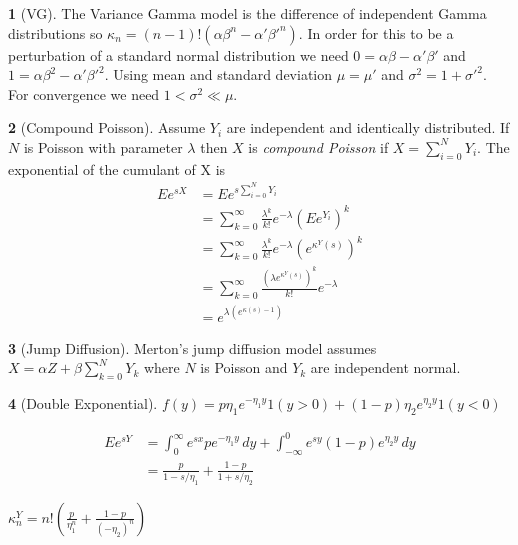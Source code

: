 \documentclass[fleqn]{amsart}
\theoremstyle{definition}
\newtheorem*{example}{}
\begin{document}
\begin{example}[VG]
The Variance Gamma model is the difference of independent Gamma distributions
so \(\kappa_n = (n-1)!(\alpha\beta^n - \alpha'\beta'^n)\).
In order for this to be a perturbation of a standard normal
distribution we need \(0 = \alpha\beta - \alpha'\beta'\)
and \(1 = \alpha\beta^2 - \alpha'\beta'^2\).
Using mean and standard deviation
\(\mu = \mu'\) and \(\sigma^2 = 1 + \sigma'^2\).
For convergence we need \(1 < \sigma^2 \ll \mu\).
\end{example}

\begin{example}[Compound Poisson]
Assume \(Y_i\) are independent and identically distributed. If \(N\) is
Poisson with parameter \(\lambda\) then \(X\) is {\em compound Poisson}
if \(X = \sum_{i=0}^N Y_i\).
The exponential of the cumulant of X is
\begin{align*}
Ee^{sX} &= Ee^{s\sum_{i=0}^N Y_i}\\
&= \sum_{k=0}^\infty \frac{\lambda^k}{k!}e^{-\lambda}(Ee^{Y_i})^k\\
&= \sum_{k=0}^\infty \frac{\lambda^k}{k!}e^{-\lambda}(e^{\kappa^Y(s)})^k\\
&= \sum_{k=0}^\infty \frac{(\lambda e^{\kappa^Y(s)})^k}{k!}e^{-\lambda}\\
&= e^{\lambda(e^{\kappa(s) - 1})}
\end{align*}
\end{example}

\begin{example}[Jump Diffusion]
Merton's \cite{Mer?} jump diffusion model assumes
\(X = \alpha Z + \beta\sum_{k=0}^N Y_k\) where
\(N\) is Poisson and \(Y_k\) are independent normal.
\end{example}

\begin{example}[Double Exponential]
\(f(y) = p\eta_1 e^{-\eta_1 y}1(y > 0) + (1 - p)\eta_2 e^{\eta_2 y}1(y < 0)\)

\begin{align*}
Ee^{sY} &= \int_0^\infty e^{sx} pe^{-\eta_1 y}\,dy
+ \int_{-\infty}^0 e^{sy} (1-p)e^{\eta_2 y}\,dy\\
&= \frac{p}{1-s/\eta_1} + \frac{1-p}{1 + s/\eta_2}
\end{align*}

\(\kappa^Y_n = n!(\frac{p}{\eta_1^n} + \frac{1-p}{(-\eta_2)^n})\)
\end{example}

\end{document}
